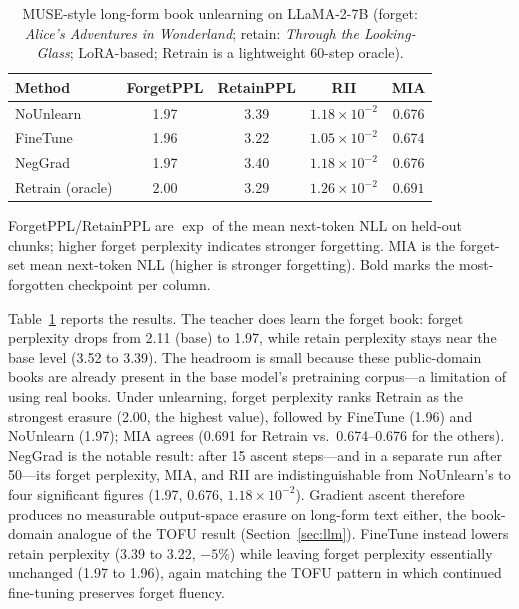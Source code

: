 \documentclass[smallextended]{svjour3}       %
\begin{document}
\begin{table}[t]
\centering
\small
\caption{MUSE-style long-form book unlearning on LLaMA-2-7B (forget: \emph{Alice's Adventures in Wonderland}; retain: \emph{Through the Looking-Glass}; LoRA-based; Retrain is a lightweight 60-step oracle).}\label{tab:muse}
\setlength{\tabcolsep}{2pt}
\begin{tabular}{l c c c c}
\toprule
Method & ForgetPPL & RetainPPL & RII & MIA \\
\midrule
NoUnlearn & 1.97 & 3.39 & $1.18{\times}10^{-2}$ & 0.676 \\
FineTune & 1.96 & $\mathbf{3.22}$ & $1.05{\times}10^{-2}$ & 0.674 \\
NegGrad & 1.97 & 3.40 & $1.18{\times}10^{-2}$ & 0.676 \\
Retrain (oracle) & $\mathbf{2.00}$ & 3.29 & $1.26{\times}10^{-2}$ & $\mathbf{0.691}$ \\
\bottomrule
\end{tabular}
\par\vspace{2pt}\footnotesize ForgetPPL/RetainPPL are $\exp$ of the mean next-token NLL on held-out chunks; higher forget perplexity indicates stronger forgetting. MIA is the forget-set mean next-token NLL (higher is stronger forgetting). Bold marks the most-forgotten checkpoint per column.
\end{table}

Table~\ref{tab:muse} reports the results. The teacher does learn the forget book: forget perplexity drops from 2.11 (base) to 1.97, while retain perplexity stays near the base level (3.52 to 3.39). The headroom is small because these public-domain books are already present in the base model's pretraining corpus---a limitation of using real books. Under unlearning, forget perplexity ranks Retrain as the strongest erasure (2.00, the highest value), followed by FineTune (1.96) and NoUnlearn (1.97); MIA agrees (0.691 for Retrain vs.\ 0.674--0.676 for the others). NegGrad is the notable result: after 15 ascent steps---and in a separate run after 50---its forget perplexity, MIA, and RII are indistinguishable from NoUnlearn's to four significant figures (1.97, 0.676, $1.18{\times}10^{-2}$). Gradient ascent therefore produces no measurable output-space erasure on long-form text either, the book-domain analogue of the TOFU result (Section~\ref{sec:llm}). FineTune instead lowers retain perplexity (3.39 to 3.22, $-5\%$) while leaving forget perplexity essentially unchanged (1.97 to 1.96), again matching the TOFU pattern in which continued fine-tuning preserves forget fluency.
\end{document}
